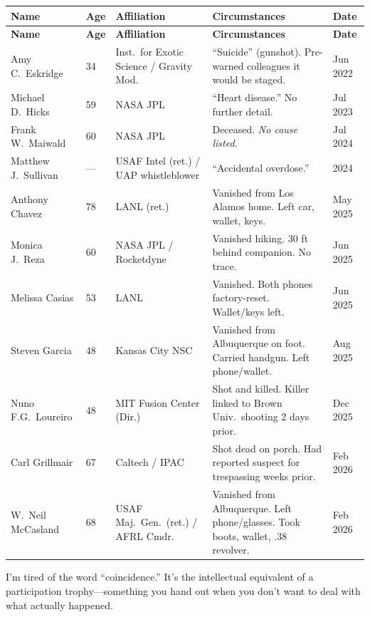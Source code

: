 \documentclass[11pt,a4paper]{article}
\begin{document}
\begin{center}
\small
\begin{longtable}{p{2.8cm} p{0.5cm} p{3.5cm} p{4.5cm} p{1.5cm}}
\toprule
\textbf{Name} & \textbf{Age} & \textbf{Affiliation} & \textbf{Circumstances} & \textbf{Date} \\
\midrule
\endfirsthead
\toprule
\textbf{Name} & \textbf{Age} & \textbf{Affiliation} & \textbf{Circumstances} & \textbf{Date} \\
\midrule
\endhead
Amy C.\ Eskridge & 34 & Inst.\ for Exotic Science / Gravity Mod. & ``Suicide'' (gunshot). Pre-warned colleagues it would be staged. & Jun 2022 \\
\midrule
Michael D.\ Hicks & 59 & NASA JPL & ``Heart disease.'' No further detail. & Jul 2023 \\
\midrule
Frank W.\ Maiwald & 60 & NASA JPL & Deceased. \textit{No cause listed.} & Jul 2024 \\
\midrule
Matthew J.\ Sullivan & --- & USAF Intel (ret.) / UAP whistleblower & ``Accidental overdose.'' & 2024 \\
\midrule
Anthony Chavez & 78 & LANL (ret.) & Vanished from Los Alamos home. Left car, wallet, keys. & May 2025 \\
\midrule
Monica J.\ Reza & 60 & NASA JPL / Rocketdyne & Vanished hiking. 30 ft behind companion. No trace. & Jun 2025 \\
\midrule
Melissa Casias & 53 & LANL & Vanished. Both phones factory-reset. Wallet/keys left. & Jun 2025 \\
\midrule
Steven Garcia & 48 & Kansas City NSC & Vanished from Albuquerque on foot. Carried handgun. Left phone/wallet. & Aug 2025 \\
\midrule
Nuno F.G.\ Loureiro & 48 & MIT Fusion Center (Dir.) & Shot and killed. Killer linked to Brown Univ.\ shooting 2 days prior. & Dec 2025 \\
\midrule
Carl Grillmair & 67 & Caltech / IPAC & Shot dead on porch. Had reported suspect for trespassing weeks prior. & Feb 2026 \\
\midrule
W.\ Neil McCasland & 68 & USAF Maj.\ Gen.\ (ret.) / AFRL Cmdr. & Vanished from Albuquerque. Left phone/glasses. Took boots, wallet, .38 revolver. & Feb 2026 \\
\bottomrule
\end{longtable}
\end{center}

I'm tired of the word ``coincidence.'' It's the intellectual equivalent of a participation trophy---something you hand out when you don't want to deal with what actually happened.
\end{document}
